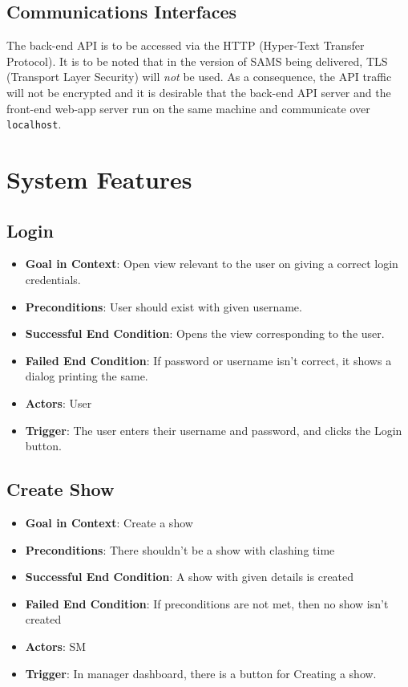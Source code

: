 \documentclass{scrreprt}
\begin{document}
\section{Communications Interfaces}
The back-end API is to be accessed via the HTTP (Hyper-Text Transfer Protocol). It is to be noted that in the version of SAMS being delivered, TLS (Transport Layer Security) will \emph{not} be used. As a consequence, the API traffic will not be encrypted and it is desirable that the back-end API server and the front-end web-app server run on the same machine and communicate over \texttt{localhost}.


\chapter{System Features}


\section{Login}
\begin{itemize}
\item \textbf{Goal in Context}: Open view relevant to the user on giving a correct login credentials.
\item \textbf{Preconditions}: User should exist with given username.
\item \textbf{Successful End Condition}: Opens the view corresponding to the user.
\item \textbf{Failed End Condition}: If password or username isn't correct, it shows a dialog printing the same.
\item \textbf{Actors}: User
\item \textbf{Trigger}: The user enters their username and password, and clicks the Login button.
\end{itemize}

\section{Create Show}
\begin{itemize}
\item \textbf{Goal in Context}: Create a show
\item \textbf{Preconditions}: There shouldn't be a show with clashing time
\item \textbf{Successful End Condition}: A show with given details is created
\item \textbf{Failed End Condition}: If preconditions are not met, then no show isn't created
\item \textbf{Actors}: SM
\item \textbf{Trigger}: In manager dashboard, there is a button for Creating a show.
\end{itemize}
\end{document}
